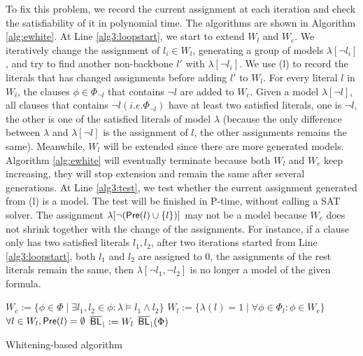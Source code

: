 To fix this problem, we record the current assignment at each iteration and check the satisfiability of it in polynomial time. The algorithms are shown in Algorithm \ref{alg:ewhite}. At Line \ref{alg3:loopstart}, we start to extend $W_l$ and $W_c$.
We iteratively change the assignment of $l_i\in W_l$, generating a group of models $\lambda[\neg l_i]$, and try to find another non-backbone $l'$ with $\lambda[\neg l_i]$.
We use \Pre(l) to record the literals that has changed assignments before adding $l'$ to $W_l$.
For every literal $l$ in $W_l$, the clauses $\phi\in\Phi_{\neg l}$ that contains $\neg l$ are added to $W_c$. Given a model $\lambda[\neg l]$, all clauses that contains $\neg l (i.e. \Phi_{\neg l})$ have at least two satisfied literals, one is $\neg l$, the other is one of the satisfied literals of model $\lambda$ (because the only difference between $\lambda$ and $\lambda[\neg l]$ is the assignment of $l$, the other assignments remains the same).
Meanwhile, $W_l$ will be extended since there are more generated models. Algorithm \ref{alg:ewhite} will eventually terminate because both $W_l$ and $W_c$ keep increasing, they will stop extension and remain the same after several generations.
At Line \ref{alg3:test}, we test whether the current assignment generated from \Pre(l) is a model. The test will be finished in P-time, without calling a SAT solver. The assignment $\lambda[\neg (\textsf{Pre}(l)\cup \{l\})]$ may not be a model because $W_c$ does not shrink together with the change of the assignments. For instance, if a clause only has two satisfied literals $l_1,l_2$, after two iterations started from Line \ref{alg3:loopstart}, both $l_1$ and $l_2$ are assigned to 0, the assignments of the rest literals remain the same, then $\lambda[\neg l_1,\neg l_2]$ is no longer a model of the given formula.

\begin{algorithm}
\SetAlgoShortEnd
\SetFillComment
{}
$W_c:=\{\phi\in\Phi\mid \exists l_1,l_2\in\phi: \lambda\models l_1\wedge l_2\}$\;\label{alg3:l1}
$W_l:=\{\lambda(l)=1\mid \forall\phi\in\Phi_l: \phi\in W_c\}$\; \label{alg3:l2}
$\forall l\in W_l, \textsf{Pre}(l)=\emptyset$\;
\label{alg3:loopend}
${\sf \overline{BL}_\downharpoonright}:=W_l$\;
\Return ${\sf \overline{BL}_\downharpoonright}(\Phi)$\;
\caption{Whitening-based algorithm}
\label{alg:ewhite}
\end{algorithm}



